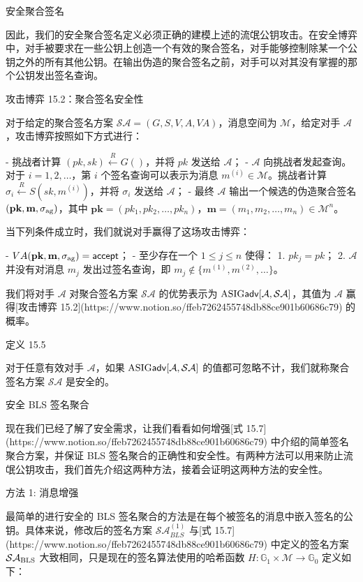 安全聚合签名

因此，我们的安全聚合签名定义必须正确的建模上述的流氓公钥攻击。在安全博弈中，对手被要求在一些公钥上创造一个有效的聚合签名，对手能够控制除某一个公钥之外的所有其他公钥。在输出伪造的聚合签名之前，对手可以对其没有掌握的那个公钥发出签名查询。

攻击博弈 15.2：聚合签名安全性

对于给定的聚合签名方案 $\mathcal{SA}=(G,S,V,A,VA)$，消息空间为 $\mathcal{M}$，给定对手 $\mathcal{A}$，攻击博弈按照如下方式进行：

- 挑战者计算 $(pk,sk)\overset{R}\leftarrow G()$，并将 $pk$ 发送给 $\mathcal{A}$；
- $\mathcal{A}$ 向挑战者发起查询。对于 $i=1,2,\dots$，第 $i$ 个签名查询可以表示为消息 $m^{(i)}\in\mathcal{M}$。挑战者计算 $\sigma_{i}\overset{R}\leftarrow S(sk,m^{(i)})$，并将 $\sigma_i$ 发送给 $\mathcal{A}$；
- 最终 $\mathcal{A}$ 输出一个候选的伪造聚合签名 $(\mathbf{pk},\mathbf{m},\sigma_{\rm ag})$，其中 $\mathbf{pk}=(pk_1, pk_2, \dots, pk_n)$，$\mathbf{m}=(m_1,m_2,\dots,m_n)\in\mathcal{M}^n$。

当下列条件成立时，我们就说对手赢得了这场攻击博弈：

- $VA(\mathbf{pk},\mathbf{m},\sigma_{\rm ag})=\mathsf{accept}$；
- 至少存在一个 $1\leq j \leq n$ 使得：
    1. $pk_j=pk$；
    2. $\mathcal{A}$ 并没有对消息 $m_j$ 发出过签名查询，即 $m_j \notin \{m^{(1)},m^{(2)},\dots\}$。

我们将对手 $\mathcal{A}$ 对聚合签名方案 $\mathcal{SA}$ 的优势表示为 $\rm{ASIG\mathsf{adv}}[\mathcal{A},\mathcal{SA}]$，其值为 $\mathcal{A}$ 赢得[攻击博弈 15.2](https://www.notion.so/ffeb7262455748db88ce901b60686c79) 的概率。

定义 15.5

对于任意有效对手 $\mathcal{A}$，如果 $\rm{ASIG\mathsf{adv}}[\mathcal{A},\mathcal{SA}]$ 的值都可忽略不计，我们就称聚合签名方案 $\mathcal{SA}$ 是安全的。

安全 BLS 签名聚合

现在我们已经了解了安全需求，让我们看看如何增强[式 15.7](https://www.notion.so/ffeb7262455748db88ce901b60686c79) 中介绍的简单签名聚合方案，并保证 BLS 签名聚合的正确性和安全性。有两种方法可以用来防止流氓公钥攻击，我们首先介绍这两种方法，接着会证明这两种方法的安全性。

方法 1: 消息增强

最简单的进行安全的 BLS 签名聚合的方法是在每个被签名的消息中嵌入签名的公钥。具体来说，修改后的签名方案 $\mathcal{SA}_{BLS}^{(1)}$ 与[式 15.7](https://www.notion.so/ffeb7262455748db88ce901b60686c79) 中定义的签名方案 $\mathcal{SA}_{\rm BLS}$ 大致相同，只是现在的签名算法使用的哈希函数 $H: \mathbb{G}_1 \times \mathcal{M} \to \mathbb{G}_0$ 定义如下：

